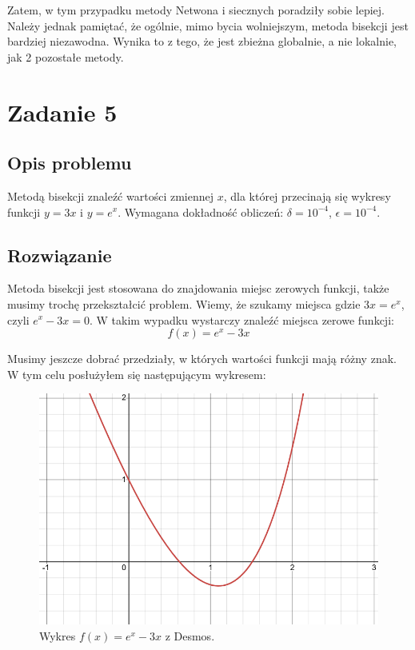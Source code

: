 \documentclass{article}
\begin{document}
Zatem, w tym przypadku metody Netwona i siecznych poradziły sobie lepiej.
Należy jednak pamiętać, że ogólnie, mimo bycia wolniejszym, metoda bisekcji jest bardziej niezawodna.
Wynika to z tego, że jest zbieżna globalnie, a nie lokalnie, jak 2 pozostałe metody.

\section{Zadanie 5}
\subsection{Opis problemu}
Metodą bisekcji znaleźć wartości zmiennej \( x \), dla której przecinają się wykresy funkcji \( y = 3x \) i \( y = e^x \). Wymagana dokładność obliczeń: \( \delta = 10^{-4} \), \( \epsilon = 10^{-4} \).

\subsection{Rozwiązanie}
Metoda bisekcji jest stosowana do znajdowania miejsc zerowych funkcji, także musimy trochę przekształcić problem.
Wiemy, że szukamy miejsca gdzie $3x = e^x$, czyli $e^x -3x = 0$. W takim wypadku wystarczy znaleźć miejsca zerowe funkcji:
$$f(x) = e^x - 3x$$

Musimy jeszcze dobrać przedziały, w których wartości funkcji mają różny znak. W tym celu posłużyłem się następującym wykresem:
\begin{figure}[H]
\centering
\includegraphics[width=\textwidth]{plot5.png}
\caption{Wykres $f(x) = e^x - 3x$ z Desmos.}
\end{figure}
\end{document}
